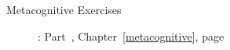 \documentclass[../main.tex]{subfiles}
\begin{document}
%
\begin{description}
\item[Metacognitive Exercises]: Part~, Chapter~\ref{metacognitive}, page~\pageref{metacognitive}
\end{description}
\end{document}
